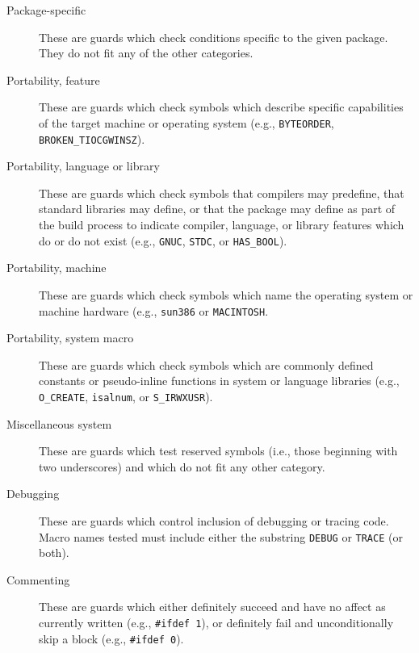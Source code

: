 \begin{description}

\item[Package-specific] These are guards which check conditions specific
      to the given package.  They do not fit any of the other categories.

\item[Portability, feature] These are guards which check symbols which
      describe specific capabilities of the target machine or operating
      system (e.g., \texttt{BYTEORDER}, \texttt{BROKEN_TIOCGWINSZ}).

\item[Portability, language or library] These are guards which check
      symbols that compilers may predefine, that standard libraries may
      define, or that the package may define as part of the build
      process to indicate compiler, language, or library features which
      do or do not exist (e.g., \texttt{GNUC}, \texttt{STDC}, or \texttt{HAS_BOOL}).

\item[Portability, machine] These are guards which check symbols which
      name the operating system or machine hardware (e.g.,
      \texttt{sun386} or \texttt{MACINTOSH}.
      
\item[Portability, system macro] These are guards which check symbols
      which are commonly defined constants or pseudo-inline functions in
      system or language libraries (e.g., \texttt{O_CREATE},
      \texttt{isalnum}, or \texttt{S_IRWXUSR}).

\item[Miscellaneous system] These are guards which test reserved symbols
      (i.e., those beginning with two underscores) and which do not
      fit any other category.
      
\item[Debugging] These are guards which control inclusion of debugging
      or tracing code.  Macro names tested must include either the
      substring \texttt{DEBUG} or \texttt{TRACE} (or both).
      
\item[Commenting] These are guards which either definitely succeed and
      have no affect as currently written (e.g., \texttt{#ifdef 1}), or
      definitely fail and unconditionally skip a block (e.g.,
      \texttt{#ifdef 0}).
      

\end{description}
